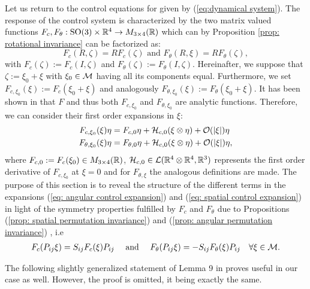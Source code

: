 \label{sec: linearization}
Let us return to the control equations for \spr given by (\ref{eq:dynamical system}). The response of the control system is characterized by the two matrix valued functions $F_c, F_{\theta}: \operatorname{SO}(3) \times \mathbb{R}^4 \to M_{3 \times 4}(\mathbb{R})$ which can by Proposition \ref{prop: rotational invariance} can be factorized as:
\begin{equation}
\label{eq: reminder control system}
	F_{c}(R, \zeta) = R F_{c}(\zeta) \text{ and } F_{\theta}(R, \xi) = R F_{\theta}(\zeta),
\end{equation}
with $F_{c}(\zeta) := F_c(I, \zeta)$ and $F_{\theta}(\zeta) := F_{\theta}(I, \zeta)$. Hereinafter, we suppose that $\zeta := \xi_0 + \xi$ with $\xi_0 \in \mathcal{M}$ having all its components equal. Furthermore, we set $F_{c, \xi_0}(\xi) := F_{c}(\xi_0 + \xi)$ and analogously $F_{\theta, \xi_0}(\xi) := F_{\theta}(\xi_0 + \xi)$. It has been shown in \cite{Alouges2013} that $F$ and thus both $F_{ c, \xi_0}$ and $F_{\theta, \xi_0}$ are analytic functions. Therefore, we can consider their first order expansions in $\xi$:
\begin{align}
\label{eq: spatial control expansion}
	F_{c, \xi_0}(\xi)\eta &= F_{c, 0} \eta  + \mathcal{H}_{c,0}(\xi \otimes \eta) + \mathcal{O}(|\xi|)\eta\\
\label{eq: angular control expansion}
	F_{\theta, \xi_0}(\xi) \eta &= F_{\theta, 0} \eta + \mathcal{H}_{c, 0}(\xi \otimes \eta) + \mathcal{O}(|\xi|)\eta,
\end{align}
where $F_{c,0} := F_{c}(\xi_0) \in M_{3 \times 4}(\mathbb{R})$, $\mathcal{H}_{c,0}\in \mathcal{L}(\mathbb{R}^4 \otimes \mathbb{R}^4, \mathbb{R}^3)$ represents the first order derivative of $F_{c, \xi_0}$ at $\xi = 0$ and for $F_{\theta, \xi}$ the analogous definitions are made.
The purpose of this section is to reveal the structure of the different terms in the expansions (\ref{eq: angular control expansion}) and (\ref{eq: spatial control expansion}) in light of the symmetry properties fulfilled by $F_{c}$ and $F_{\theta}$ due to Propositions (\ref{prop: spatial permutation invariance}) and (\ref{prop: angular permutation invariance}) , i.e
\begin{align}
\label{eq: spatial and angular first order expansion}
	F_{c}(P_{ij} \xi) = S_{ij} F_{c}(\xi) P_{ij}& & \text{ and } & & 			F_{\theta}(P_{ij} \xi) = - S_{ij} F_{\theta}(\xi) P_{ij} & & \forall \xi \in \mathcal{M}.
\end{align}

The following slightly generalized statement of Lemma 9 in \cite{Alouges2017} proves useful in our case as well. However, the proof is omitted, it being exactly the same.

